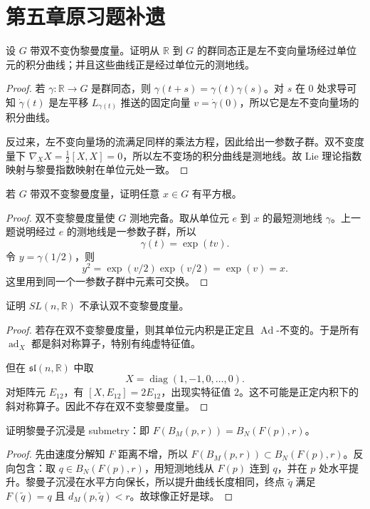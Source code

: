 \documentclass[11pt,a4paper,openany]{ctexbook}
\numberwithin{equation}{chapter}
\begin{document}
\section{第五章原习题补遗}

\begin{problem}
设 \(G\) 带双不变伪黎曼度量。证明从 \(\mathbb R\) 到 \(G\) 的群同态正是左不变向量场经过单位元的积分曲线；并且这些曲线正是经过单位元的测地线。
\end{problem}
\begin{proof}
若 \(\gamma\colon\mathbb R\to G\) 是群同态，则 \(\gamma(t+s)=\gamma(t)\gamma(s)\)。对 \(s\) 在 \(0\) 处求导可知 \(\dot\gamma(t)\) 是左平移 \(L_{\gamma(t)}\) 推送的固定向量 \(v=\dot\gamma(0)\)，所以它是左不变向量场的积分曲线。

反过来，左不变向量场的流满足同样的乘法方程，因此给出一参数子群。双不变度量下 \(\nabla_XX=\frac12[X,X]=0\)，所以左不变场的积分曲线是测地线。故 Lie 理论指数映射与黎曼指数映射在单位元处一致。
\end{proof}

\begin{problem}
若 \(G\) 带双不变黎曼度量，证明任意 \(x\in G\) 有平方根。
\end{problem}
\begin{proof}
双不变黎曼度量使 \(G\) 测地完备。取从单位元 \(e\) 到 \(x\) 的最短测地线 \(\gamma\)。上一题说明经过 \(e\) 的测地线是一参数子群，所以
\[
\gamma(t)=\exp(tv).
\]
令 \(y=\gamma(1/2)\)，则
\[
y^2=\exp(v/2)\exp(v/2)=\exp(v)=x.
\]
这里用到同一个一参数子群中元素可交换。
\end{proof}

\begin{problem}
证明 \(SL(n,\mathbb R)\) 不承认双不变黎曼度量。
\end{problem}
\begin{proof}
若存在双不变黎曼度量，则其单位元内积是正定且 \(\operatorname{Ad}\)-不变的。于是所有 \(\operatorname{ad}_X\) 都是斜对称算子，特别有纯虚特征值。

但在 \(\mathfrak{sl}(n,\mathbb R)\) 中取
\[
X=\operatorname{diag}(1,-1,0,\ldots,0).
\]
对矩阵元 \(E_{12}\)，有 \([X,E_{12}]=2E_{12}\)，出现实特征值 \(2\)。这不可能是正定内积下的斜对称算子。因此不存在双不变黎曼度量。
\end{proof}

\begin{problem}
证明黎曼子沉浸是 submetry：即 \(F(B_M(p,r))=B_N(F(p),r)\)。
\end{problem}
\begin{proof}
先由速度分解知 \(F\) 距离不增，所以 \(F(B_M(p,r))\subset B_N(F(p),r)\)。反向包含：取 \(q\in B_N(F(p),r)\)，用短测地线从 \(F(p)\) 连到 \(q\)，并在 \(p\) 处水平提升。黎曼子沉浸在水平方向保长，所以提升曲线长度相同，终点 \(\tilde q\) 满足 \(F(\tilde q)=q\) 且 \(d_M(p,\tilde q)<r\)。故球像正好是球。
\end{proof}
\end{document}
